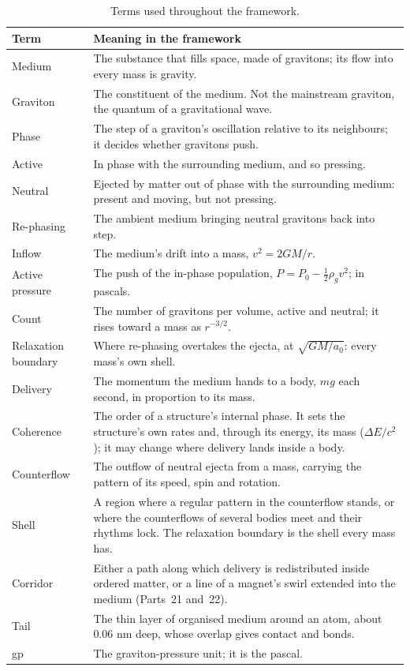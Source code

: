 \documentclass[11pt,a4paper]{article}
\begin{document}
\begin{table}[H]
\centering
\small
\renewcommand{\arraystretch}{1.2}
\begin{tabular}{@{}>{\raggedright\arraybackslash}p{}>{\raggedright\arraybackslash}p{}@{}}
\toprule
\textbf{Term} & \textbf{Meaning in the framework} \\
\midrule
Medium & The substance that fills space, made of gravitons; its flow into every mass is gravity. \\
Graviton & The constituent of the medium. Not the mainstream graviton, the quantum of a gravitational wave. \\
Phase & The step of a graviton's oscillation relative to its neighbours; it decides whether gravitons push. \\
Active & In phase with the surrounding medium, and so pressing. \\
Neutral & Ejected by matter out of phase with the surrounding medium: present and moving, but not pressing. \\
Re-phasing & The ambient medium bringing neutral gravitons back into step. \\
Inflow & The medium's drift into a mass, $v^2 = 2GM/r$. \\
Active pressure & The push of the in-phase population, $P = P_0 - \tfrac12\rho_g v^2$; in pascals. \\
Count & The number of gravitons per volume, active and neutral; it rises toward a mass as $r^{-3/2}$. \\
Relaxation boundary & Where re-phasing overtakes the ejecta, at $\sqrt{GM/a_0}$: every mass's own shell. \\
Delivery & The momentum the medium hands to a body, $mg$ each second, in proportion to its mass. \\
Coherence & The order of a structure's internal phase. It sets the structure's own rates and, through its energy, its mass ($\Delta E/c^2$); it may change where delivery lands inside a body. \\
Counterflow & The outflow of neutral ejecta from a mass, carrying the pattern of its speed, spin and rotation. \\
Shell & A region where a regular pattern in the counterflow stands, or where the counterflows of several bodies meet and their rhythms lock. The relaxation boundary is the shell every mass has. \\
Corridor & Either a path along which delivery is redistributed inside ordered matter, or a line of a magnet's swirl extended into the medium (Parts~21 and~22). \\
Tail & The thin layer of organised medium around an atom, about 0.06 nm deep, whose overlap gives contact and bonds. \\
gp & The graviton-pressure unit; it is the pascal. \\
\bottomrule
\end{tabular}
\caption{Terms used throughout the framework.}
\label{tab:glossary}
\end{table}
\end{document}
